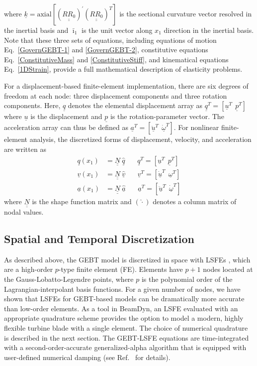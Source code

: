 \documentclass{aiaa-tc}
\newcommand{\tens}[1]{\underline{\underline{#1}}}
\renewcommand{\vec}[1]{\underline{#1}}
\begin{document}
where $\vec{k} = \mathrm{axial}[(\tens{R R_0})^\prime (\tens{R R_0})^T]$ is the sectional
curvature vector resolved in the inertial basis and $\bar{\imath}_1$ is the unit
vector along $x_1$ direction in the inertial basis. Note that these
three sets of equations, including equations of motion
Eq.~\eqref{GovernGEBT-1} and \eqref{GovernGEBT-2}, constitutive equations
Eq.~\eqref{ConstitutiveMass} and \eqref{ConstitutiveStiff}, and kinematical
equations Eq.~\eqref{1DStrain}, provide a full mathematical description of elasticity problems. 

For a displacement-based finite-element implementation, there are six
degrees of freedom at each node: three displacement components and three
rotation components. Here, $\vec{q}$ denotes the elemental
displacement array as $\underline{q}^T=\left[
\underline{u}^T~~\underline{p}^T\right]$ where $\vec{u}$ is the
displacement and $\vec{p}$ is the rotation-parameter vector. The
acceleration array can thus be defined as $\underline{a}^T=\left[
\ddot{\underline{u}}^T~~ \dot{\underline{\omega}}^T \right]$. For nonlinear
finite-element analysis, the discretized forms of
displacement, velocity, and acceleration are written as
\begin{align}
	\label{DiscretizedDisp}
	\underline{q} (x_1) &= \underline{\underline{N}} ~\hat{\underline{q}}~~~~~~~~\underline{q}^T = \left[ \underline{u}^T~~\underline{p}^T \right] \\
	\label{DiscretizedVel}
	\underline{v}(x_1) &= \underline{\underline{N}}~\hat{\underline{v}}~~~~~~~~\underline{v}^T = \left[\underline{\dot{u}}^T~~\underline{\omega}^T \right] \\
	\label{DiscretizedAcc}
	\underline{a}(x_1) &= \underline{\underline{N}}~ \hat{\underline{a}}~~~~~~~~\underline{a}^T = \left[ \ddot{\underline{u}}^T~~\dot{\underline{\omega}}^T \right]	
\end{align}
where $\tens{N}$ is the shape function matrix and $(\hat{\cdot})$ denotes a
column matrix of nodal values.

\subsection{Spatial and Temporal Discretization}

As described above, the GEBT model is discretized in space with LSFEs\cite{Ronquist-Patera:1987} , which are a high-order $p$-type finite element (FE).   
Elements have $p+1$ nodes located at the Gauss-Lobatto-Legendre points, where $p$ is the polynomial order of the Lagrangian-interpolant basis functions.  
For a given number of nodes, we have shown\cite{Wang:SFE2013,Wang:GEBT2014} that LSFEs for GEBT-based models can be dramatically more accurate than low-order elements.   
As a tool in BeamDyn, an LSFE evaluated with an appropriate quadrature scheme provides the option to model a modern, highly flexible turbine blade with a single element.  
The choice of numerical quadrature is described in the next section.
The GEBT-LSFE equations are time-integrated with a second-order-accurate generalized-alpha algorithm that is equipped with user-defined numerical damping (see Ref.~\cite{Wang:GEBT2014} for details).  
\end{document}

